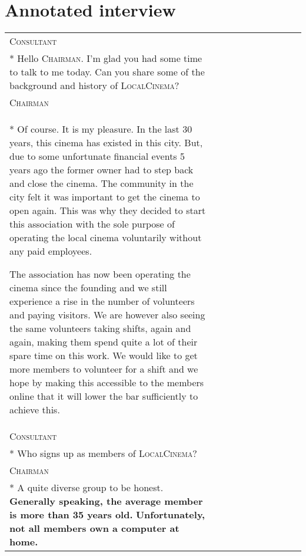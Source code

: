 \chapter{Annotated interview}
\label{appendix:interview}

\begingroup

\newcommand{\dialogue}[3]{%
	\scshape\footnotesize #1 \rule{0pt}{3ex} \\*%
	\setlength{\parskip}{4pt}%
	#2 & \itshape #3}

\noindent\begin{longtable}[l]{p{0.7\linewidth}p{0.3\linewidth}}
	\toprule
	\endfirsthead
	\midrule
	\endhead
	\midrule
	\endfoot
	\bottomrule
	\endlastfoot

	\dialogue{Consultant}{%
		Hello \textsc{Chairman}.
		I'm glad you had some time to talk to me today.
		Can you share some of the background and history of \textsc{LocalCinema}?
	}{}
	\\
	\dialogue{Chairman}{%
		Of course.
		It is my pleasure.
		In the last 30 years, this cinema has existed in this city.
		But, due to some unfortunate financial events 5 years ago the former owner had to step back and close the cinema.
		The community in the city felt it was important to get the cinema to open again.
		This was why they decided to start this association with the sole purpose of operating the local cinema voluntarily without any paid employees.

		The association has now been operating the cinema since the founding and we still experience a rise in the number of volunteers and paying visitors.
		We are however also seeing the same volunteers taking shifts, again and again, making them spend quite a lot of their spare time on this work.
		We would like to get more members to volunteer for a shift
		and we hope by making this accessible to the members online that it will lower the bar sufficiently to achieve this.
	}{}
	\\
	\dialogue{Consultant}{%
		Who signs up as members of \textsc{LocalCinema}?
	}{}
	\\
	\dialogue{Chairman}{%
		A quite diverse group to be honest.
		\textbf{Generally speaking, the average member is more than 35 years old.}
		\textbf{Unfortunately, not all members own a computer at home.}

}
\end{longtable}
